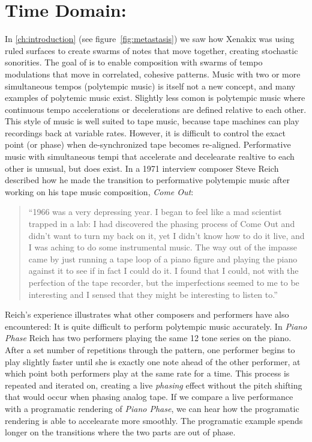 
\chapter{Time Domain: \polytempic}
\label{ch:polytempic}
In \autoref{ch:introduction} (see figure~\ref{fig:metastasis}) we saw how
Xenakix was using ruled surfaces to create swarms of notes that move
together, creating stochastic sonorities. The goal of \polytempic is
to enable composition with swarms of tempo modulations that move in
correlated, cohesive patterns. Music with two or more simultaneous
tempos (polytempic music) is itself not a new concept, and many
examples of polytemic music exist\cite{Greschak2003}. Slightly less
comon is polytempic music where continuous tempo accelerations or
decelerations are defined relative to each other.  This style of music
is well suited to tape music, because tape machines can play
recordings back at variable rates. However, it is difficult to control
the exact point (or phase) when de-synchronized tape becomes
re-aligned. Performative music with simultaneous tempi that accelerate
and decelearate realtive to each other is unusual, but does exist. In
a 1971 interview composer Steve Reich described how he made the
transition to performative polytempic music after working on his tape
music composition, \textit{Come Out}:
\begin{quotation}
  ``1966 was a very depressing year. I began to feel like a mad
  scientist trapped in a lab: I had discovered the phasing process
  of Come Out and didn't want to turn my back on it, yet I didn't know
  how to do it live, and I was aching to do some instrumental
  music. The way out of the impasse came by just running a tape loop
  of a piano figure and playing the piano against it to see if in fact
  I could do it. I found that I could, not with the perfection of the
  tape recorder, but the imperfections seemed to me to be interesting
  and I sensed that they might be interesting to listen to.''\cite{Nyman2015}
\end{quotation}
Reich's experience illustrates what other composers and performers
have also encountered: It is quite difficult to perform polytempic
music accurately. In \textit{Piano Phase} Reich has two performers
playing the same 12 tone series on the piano. After a set number of
repetitions through the pattern, one performer begins to play slightly
faster until she is exactly one note ahead of the other performer, at
which point both performers play at the same rate for a time. This
process is repeated and iterated on, creating a live \emph{phasing}
effect without the pitch shifting that would occur when phasing analog
tape. If we compare a live performance\cite{Huisman1989} with a
programatic rendering\cite{Chen2014} of \textit{Piano Phase}, we can
hear how the programatic rendering is able to accelearate more
smoothly. The programatic example spends longer on the transitions
where the two parts are out of phase.

